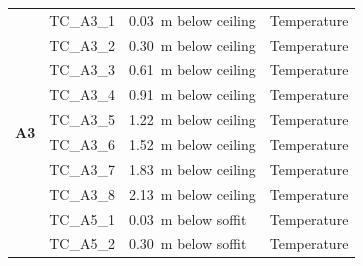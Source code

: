 \documentclass[12pt,oneside]{book}
\begin{document}
\begin{longtable}[c]{c|lll}
 \multirow{10}{*}{\large{\textbf{A3}}}
 & TC\_A3\_1  & 0.03~m below ceiling & Temperature \\
 & TC\_A3\_2  & 0.30~m below ceiling & Temperature \\
 & TC\_A3\_3  & 0.61~m below ceiling & Temperature \\
 & TC\_A3\_4  & 0.91~m below ceiling & Temperature \\
 & TC\_A3\_5  & 1.22~m below ceiling & Temperature \\
 & TC\_A3\_6  & 1.52~m below ceiling & Temperature \\
 & TC\_A3\_7  & 1.83~m below ceiling & Temperature \\
 & TC\_A3\_8  & 2.13~m below ceiling & Temperature \\
\bottomrule
\newpage
\multirow{16}{*}{\large{\textbf{A5}}}
 & TC\_A5\_1  & 0.03~m below soffit  & Temperature \\
 & TC\_A5\_2  & 0.30~m below soffit  & Temperature \\

\end{longtable}
\end{document}
